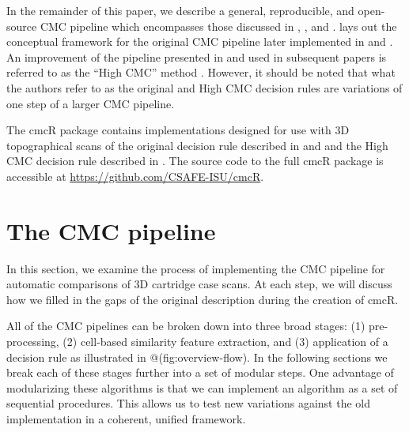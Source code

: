 \documentclass[11pt,]{isuthesis}
\begin{document}
In the remainder of this paper, we describe a general, reproducible, and open-source CMC pipeline which encompasses those discussed in \citet{song_proposed_2013}, \citet{song_3d_2014}, and \citet{tong_improved_2015}.
\citet{song_proposed_2013} lays out the conceptual framework for the original CMC pipeline later implemented in \citet{song_3d_2014} and \citet{tong_fired_2014}.
An improvement of the pipeline presented in \citet{tong_improved_2015} and used in subsequent papers is referred to as the ``High CMC'' method \citep{chen_convergence_2017}. However, it should be noted that what the authors refer to as the original and High CMC decision rules are variations of one step of a larger CMC pipeline.

The cmcR package contains implementations designed for use with 3D topographical scans of the original decision rule described in \citet{song_proposed_2013} and \citet{song_3d_2014} and the High CMC decision rule described in \citet{tong_improved_2015}.
The source code to the full cmcR package is accessible at \url{https://github.com/CSAFE-ISU/cmcR}.

\hypertarget{cmcMethod}{%
\section{The CMC pipeline}\label{cmcMethod}}

In this section, we examine the process of implementing the CMC pipeline for automatic comparisons of 3D cartridge case scans.
At each step, we will discuss how we filled in the gaps of the original description during the creation of cmcR.

All of the CMC pipelines can be broken down into three broad stages: (1) pre-processing, (2) cell-based similarity feature extraction, and (3) application of a decision rule as illustrated in @(fig:overview-flow).
In the following sections we break each of these stages further into a set of modular steps.
One advantage of modularizing these algorithms is that we can implement an algorithm as a set of sequential procedures.
This allows us to test new variations against the old implementation in a coherent, unified framework.
\end{document}
